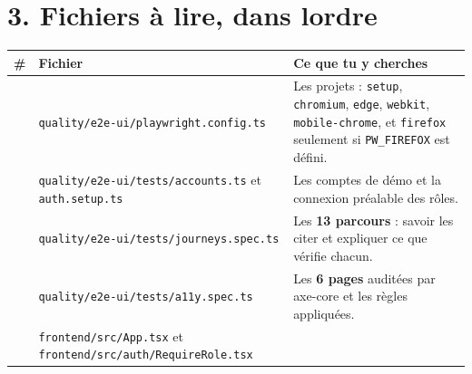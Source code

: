 \documentclass[
  11pt,
]{article}
\begin{document}
\section{3. Fichiers à lire, dans
l\textquotesingle ordre}\label{3-fichiers-uxe0-lire-dans-lordre}

\begin{longtable}[]{@{}
  >{\raggedright\arraybackslash}p{}
  >{\raggedright\arraybackslash}p{}
  >{\raggedright\arraybackslash}p{}@{}}
\toprule\noalign{}
\begin{minipage}[b]{\linewidth}\raggedright
\#
\end{minipage} & \begin{minipage}[b]{\linewidth}\raggedright
Fichier
\end{minipage} & \begin{minipage}[b]{\linewidth}\raggedright
Ce que tu y cherches
\end{minipage} \\
\midrule\noalign{}
\endhead
\bottomrule\noalign{}
\endlastfoot
1 &
\texttt{quality/}\allowbreak{}\texttt{e2e-}\allowbreak{}\texttt{ui/}\allowbreak{}\texttt{playwright.}\allowbreak{}\texttt{config.}\allowbreak{}\texttt{ts}
& Les projets : \texttt{setup}, \texttt{chromium}, \texttt{edge},
\texttt{webkit}, \texttt{mobile-chrome}, et \texttt{firefox} seulement
si \texttt{PW\_FIREFOX} est défini. \\
2 &
\texttt{quality/}\allowbreak{}\texttt{e2e-}\allowbreak{}\texttt{ui/}\allowbreak{}\texttt{tests/}\allowbreak{}\texttt{accounts.}\allowbreak{}\texttt{ts}
et \texttt{auth.setup.ts} & Les comptes de démo et la connexion
préalable des rôles. \\
3 &
\texttt{quality/}\allowbreak{}\texttt{e2e-}\allowbreak{}\texttt{ui/}\allowbreak{}\texttt{tests/}\allowbreak{}\texttt{journeys.}\allowbreak{}\texttt{spec.}\allowbreak{}\texttt{ts}
& Les \textbf{13 parcours} : savoir les citer et expliquer ce que
vérifie chacun. \\
4 &
\texttt{quality/}\allowbreak{}\texttt{e2e-}\allowbreak{}\texttt{ui/}\allowbreak{}\texttt{tests/}\allowbreak{}\texttt{a11y.}\allowbreak{}\texttt{spec.}\allowbreak{}\texttt{ts}
& Les \textbf{6 pages} auditées par axe-core et les règles
appliquées. \\
5 &
\texttt{frontend/}\allowbreak{}\texttt{src/}\allowbreak{}\texttt{App.}\allowbreak{}\texttt{tsx}
et
\texttt{frontend/}\allowbreak{}\texttt{src/}\allowbreak{}\texttt{auth/}\allowbreak{}\texttt{Require}\allowbreak{}\texttt{Role.}\allowbreak{}\texttt{tsx}

\end{longtable}
\end{document}
